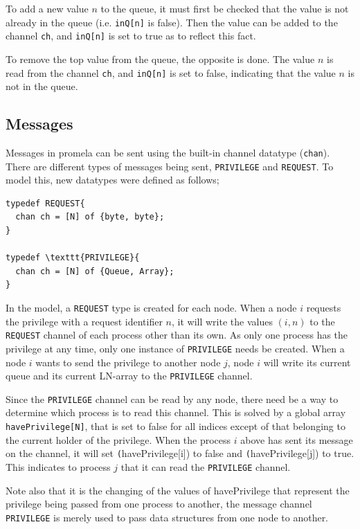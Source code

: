 \documentclass[a4paper,10pt]{llncs}
\begin{document}
To add a new value $n$ to the queue, it must first be checked that the value is not already in the queue (i.e. \texttt{inQ[n]} is false). Then the value can be added to the channel \texttt{ch}, and \texttt{inQ[n]} is set to true as to reflect this fact.

To remove the top value from the queue, the opposite is done. The value $n$ is read from the channel \texttt{ch}, and \texttt{inQ[n]} is set to false, indicating that the value $n$ is not in the queue.

\subsection{Messages}
Messages in promela can be sent using the built-in channel datatype (\texttt{chan}). There are different types of messages being sent, \texttt{PRIVILEGE} and \texttt{REQUEST}. To model this, new datatypes were defined as follows;

\begin{lstlisting}
typedef REQUEST{
  chan ch = [N] of {byte, byte};
}

typedef \texttt{PRIVILEGE}{
  chan ch = [N] of {Queue, Array};
}
\end{lstlisting}


In the model, a \texttt{REQUEST} type is created for each node. When a node $i$ requests the privilege with a request identifier $n$, it will write the values $(i,n)$ to the \texttt{REQUEST} channel of each process other than its own. As only one process has the privilege at any time, only one instance of \texttt{PRIVILEGE} needs be created. When a node $i$ wants to send the privilege to another node $j$, node $i$ will write its current queue and its current LN-array to the \texttt{PRIVILEGE} channel.

Since the \texttt{PRIVILEGE} channel can be read by any node, there need be a way to determine which process is to read this channel. This is solved by a global array \texttt{havePrivilege[N]}, that is set to false for all indices except of that belonging to the current holder of the privilege. When the process $i$ above has sent its message on the channel, it will set \texttt (havePrivilege[i]) to false and \texttt (havePrivilege[j]) to true. This indicates to process $j$ that it can read the \texttt{PRIVILEGE} channel.

Note also that it is the changing of the values of havePrivilege that represent the privilege being passed from one process to another, the message channel \texttt{PRIVILEGE} is merely used to pass data structures from one node to another.
\end{document}
